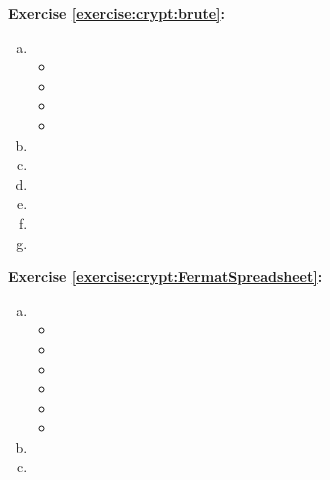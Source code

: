 \noindent\textbf{Exercise \ref{exercise:crypt:brute}:} %
\begin{enumerate}[(a)]
\item
\begin{itemize}
\item
\item
\item
\item
\end{itemize}
\item
\item
\item
\item
\item
\item
\end{enumerate}

\noindent\textbf{Exercise \ref{exercise:crypt:FermatSpreadsheet}:}
\begin{enumerate}[(a)]
\item
\begin{itemize}
\item
\item
\item
\item
\item
\item
\end{itemize}
\item
\item
\end{enumerate}

